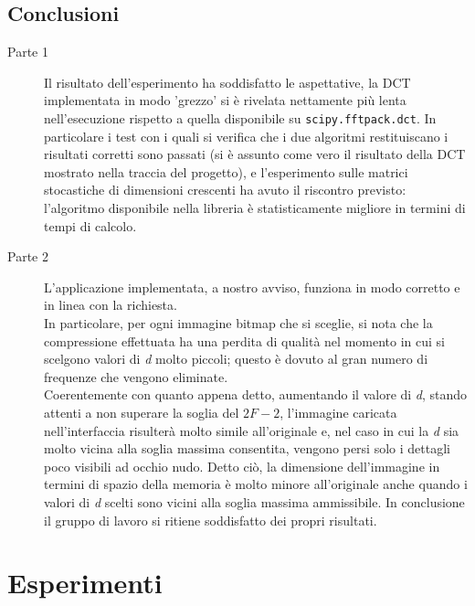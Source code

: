 \documentclass[preprint,12pt]{elsarticle}
\begin{document}
\newpage

\subsection*{Conclusioni}

\begin{description}
\item[Parte 1] Il risultato dell'esperimento ha soddisfatto le aspettative, la DCT implementata in modo 'grezzo' si è rivelata nettamente più lenta nell'esecuzione rispetto a quella disponibile su \texttt{scipy.fftpack.dct}.
In particolare i test con i quali si verifica che i due algoritmi restituiscano i risultati corretti sono passati (si è assunto come vero il risultato della DCT mostrato nella traccia del progetto), e l'esperimento sulle matrici stocastiche di dimensioni crescenti ha avuto il riscontro previsto: l'algoritmo disponibile nella libreria è statisticamente migliore in termini di tempi di calcolo.
	
\item[Parte 2] L'applicazione implementata, a nostro avviso, funziona in modo corretto e in linea con la richiesta. \\In particolare, per ogni immagine bitmap che si sceglie, si nota che la compressione effettuata ha una perdita di qualità nel momento in cui si scelgono valori di \textit{d} molto piccoli; questo è dovuto al gran numero di frequenze che vengono eliminate.\\ Coerentemente con quanto appena detto, aumentando il valore di \textit{d}, stando attenti a non superare la soglia del $2F-2$, l'immagine caricata nell'interfaccia risulterà molto simile all'originale e, nel caso in cui la \textit{d} sia molto vicina alla soglia massima consentita, vengono persi solo i dettagli poco visibili ad occhio nudo. Detto ciò, la dimensione dell'immagine in termini di spazio della memoria è molto minore all'originale anche quando i valori di \textit{d} scelti sono vicini alla soglia massima ammissibile. In conclusione il gruppo di lavoro si ritiene soddisfatto dei propri risultati.
\end{description}

\newpage
\appendix

\section{Esperimenti}
\end{document}
